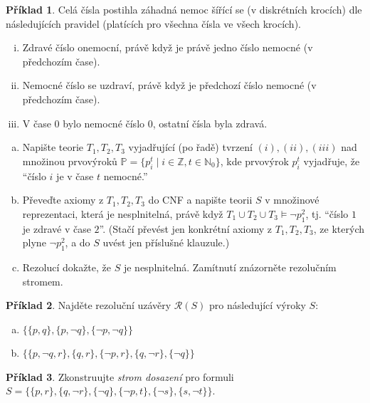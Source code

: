 \documentclass[a4paper]{article}
\theoremstyle{definition}
\newtheorem{problem}{Příklad}
\begin{document}
\medskip\begin{problem}
Celá čísla postihla záhadná nemoc šířící se (v diskrétních krocích) dle následujících pravidel (platících pro všechna čísla ve všech krocích).
\begin{enumerate}[(i)]
\item Zdravé číslo onemocní, právě když je právě jedno číslo nemocné (v předchozím čase).
\item Nemocné číslo se uzdraví, právě když je předchozí číslo nemocné (v předchozím čase).
\item V čase $0$ bylo nemocné číslo $0$, ostatní čísla byla zdravá.
\end{enumerate}
\begin{enumerate}[(a)]
\item Napište teorie $T_1, T_2, T_3$ vyjadřující (po řadě) tvrzení $(i), (ii), (iii)$ nad množinou prvovýroků $\mathbb{P}=\{p_i^t \mid i\in\mathbb{Z}, t\in\mathbb{N}_0\}$, kde prvovýrok $p_i^t$ vyjadřuje, že ``číslo $i$ je v čase $t$ nemocné.''
\item Převeďte axiomy z $T_1, T_2, T_3$ do CNF a napište teorii $S$ v množinové reprezentaci, která je nesplnitelná, právě když $T_1 \cup T_2 \cup T_3 \models \neg p_1^2$, tj. ``číslo $1$ je zdravé v čase $2$''. (Stačí převést jen konkrétní axiomy z $T_1,T_2,T_3$, ze kterých plyne $\neg p_1^2$, a do $S$ uvést jen příslušné klauzule.)
\item Rezolucí dokažte, že $S$ je nesplnitelná. Zamítnutí znázorněte rezolučním stromem.
\end{enumerate}
\end{problem}


\medskip\begin{problem}
    Najděte rezoluční uzávěry $\mathcal{R}(S)$ pro následující výroky $S$:
    \begin{enumerate}[(a)]
        \item $\{\{p,q\},\{p,\neg q\},\{\neg p,\neg q\}\}$
        \item $\{\{p,\neg q,r\},\{q,r\},\{\neg p, r\},\{q,\neg r\},\{\neg q\}\}$
    \end{enumerate}
\end{problem}
    
    
\medskip\begin{problem}
    Zkonstruujte \emph{strom dosazení} pro formuli $S=\{\{p,r\},\{q,\neg r\},\{\neg q\},\{\neg p,t\},\{\neg s\},\{s,\neg t\}\}$.
\end{problem}
\end{document}
